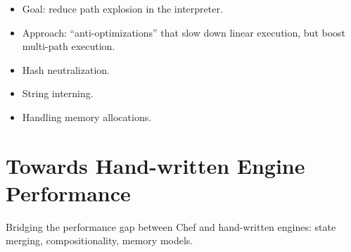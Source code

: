 \begin{itemize}
\item Goal: reduce path explosion in the interpreter.
\item Approach: ``anti-optimizations'' that slow down linear execution, but boost multi-path execution.
\item Hash neutralization.
\item String interning.
\item Handling memory allocations.
\end{itemize}

\section{Towards Hand-written Engine Performance}

Bridging the performance gap between Chef and hand-written engines: state merging, compositionality, memory models.

